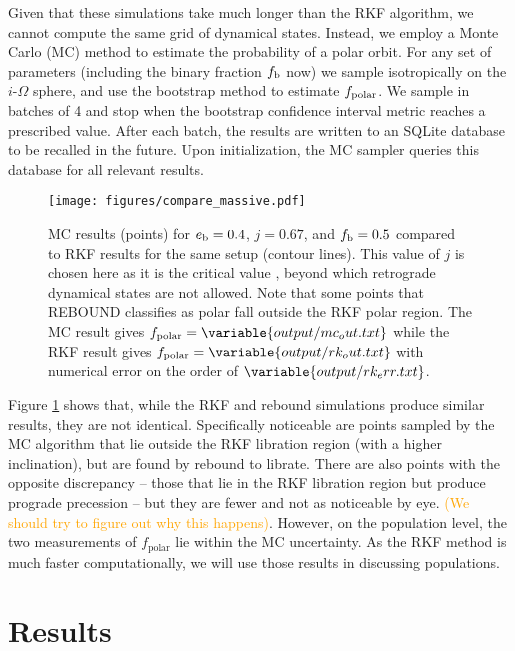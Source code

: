 \documentclass[twocolumn]{aastex631}
\newcommand{\TJ}[1]{\textcolor{orange}{#1}}
\begin{document}
Given that these simulations take much longer than the RKF algorithm, we cannot compute the same grid of dynamical states. Instead, we employ a Monte Carlo (MC) method to estimate the probability of a polar orbit. For any set of parameters (including the binary fraction $f_{\rm b}$ now) we sample isotropically on the $i$-$\Omega$ sphere, and use the bootstrap method to estimate $f_{\rm polar}$. We sample in batches of 4 and stop when the bootstrap confidence interval metric reaches a prescribed value. After each batch, the results are written to an SQLite database to be recalled in the future. Upon initialization, the MC sampler queries this database for all relevant results.


\begin{figure}
    \begin{centering}
        \texttt{[image: figures/compare\_massive.pdf]}
        \caption{
            MC results (points) for $e_{\rm b}=0.4$, $j=0.67$, and $f_{\rm b}=0.5$ compared to RKF results for the same setup (contour lines). This value of $j$ is chosen here as it is the critical value \citep[see][]{martin2019,abod2022}, beyond which retrograde dynamical states are not allowed.
            Note that some points that {\sc REBOUND} classifies as polar fall outside the RKF polar region.
            The MC result gives $f_{\text{polar}} = \variable{output/mc_out.txt}$ while the RKF result gives $f_{\text{polar}} = \variable{output/rk_out.txt}$ with
            numerical error on the order of $\variable{output/rk_err.txt}$. 
        }
        \label{fig:rkf}
    \end{centering}
\end{figure}

Figure \ref{fig:rkf} shows that, while the RKF and {\sc rebound} simulations produce similar results, they are not identical. Specifically noticeable are points sampled by the MC algorithm that lie outside the RKF libration region (with a higher inclination), but are found by {\sc rebound} to librate. There are also points with the opposite discrepancy -- those that lie in the RKF libration region but produce prograde precession -- but they are fewer and not as noticeable by eye. \TJ{(We should try to figure out why this happens)}. However, on the population level, the two measurements of $f_\text{polar}$ lie within the MC uncertainty. As the RKF method is much faster computationally, we will use those results in discussing populations.

\section{Results}
\label{sec:results}
\end{document}
